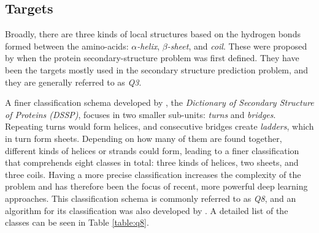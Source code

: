 \subsection{Targets}
Broadly, there are three kinds of local structures based on the hydrogen bonds formed between the amino-acids: $\alpha$\textit{-helix}, $\beta$\textit{-sheet}, and \textit{coil}. These were proposed by \cite{Pauling1951} when the protein secondary-structure problem was first defined. They have been the targets mostly used in the secondary structure prediction problem, and they are generally referred to as \textit{Q3}.

A finer classification schema developed by \cite{Kabsch1983}, the \textit{Dictionary of Secondary Structure of Proteins (DSSP)}, focuses in two smaller sub-units: \textit{turns} and \textit{bridges}. Repeating turns would form helices, and consecutive bridges create \textit{ladders}, which in turn form sheets. Depending on how many of them are found together, different kinds of helices or strands could form, leading to a finer classification that comprehends eight classes in total: three kinds of helices, two sheets, and three coils. Having a more precise classification increases the complexity of the problem and has therefore been the focus of recent, more powerful deep learning approaches. This classification schema is commonly referred to as \textit{Q8}, and an algorithm for its classification was also developed by \cite{Kabsch1983}. A detailed list of the classes can be seen in Table \ref{table:q8}.


